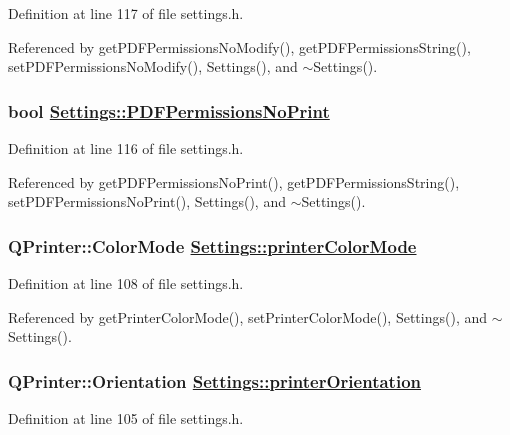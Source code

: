 Definition at line 117 of file settings.h.

Referenced by get\-PDFPermissions\-No\-Modify(), get\-PDFPermissions\-String(), set\-PDFPermissions\-No\-Modify(), Settings(), and $\sim$Settings().\hypertarget{classSettings_r23}{
\subsubsection[PDFPermissionsNoPrint]{\setlength{\rightskip}{0pt plus 5cm}bool \hyperlink{classSettings_r23}{Settings::PDFPermissions\-No\-Print}}}
\label{classSettings_r23}


Definition at line 116 of file settings.h.

Referenced by get\-PDFPermissions\-No\-Print(), get\-PDFPermissions\-String(), set\-PDFPermissions\-No\-Print(), Settings(), and $\sim$Settings().\hypertarget{classSettings_r16}{
\subsubsection[printerColorMode]{\setlength{\rightskip}{0pt plus 5cm}QPrinter::Color\-Mode \hyperlink{classSettings_r16}{Settings::printer\-Color\-Mode}}}
\label{classSettings_r16}


Definition at line 108 of file settings.h.

Referenced by get\-Printer\-Color\-Mode(), set\-Printer\-Color\-Mode(), Settings(), and $\sim$Settings().\hypertarget{classSettings_r13}{
\subsubsection[printerOrientation]{\setlength{\rightskip}{0pt plus 5cm}QPrinter::Orientation \hyperlink{classSettings_r13}{Settings::printer\-Orientation}}}
\label{classSettings_r13}


Definition at line 105 of file settings.h.


